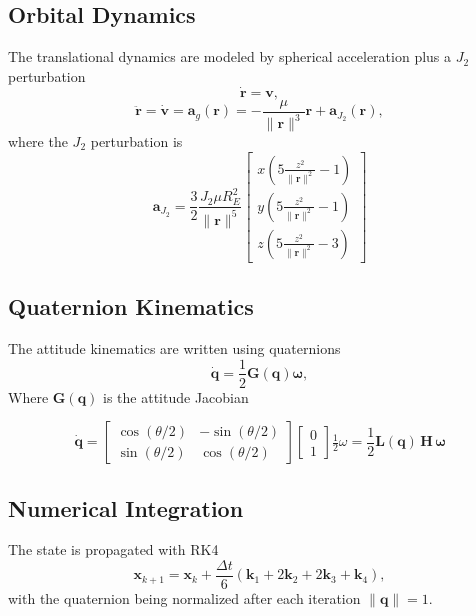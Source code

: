 \documentclass[conference,onecolumn,draftclsnofoot]{IEEEtran}
\begin{document}
\subsection{Orbital Dynamics}
The translational dynamics are modeled by spherical acceleration plus a $J_2$ perturbation \cite{markley2014fundamentals}
\begin{equation}
\dot{\mathbf{r}} = \mathbf{v},
\end{equation}
\begin{equation}
\ddot{\mathbf{r}} = \dot{\mathbf{v}} = \mathbf{a}_g(\mathbf{r}) = -\frac{\mu}{\|\mathbf{r}\|^3}\mathbf{r} + \mathbf{a}_{J_2}(\mathbf{r}),
\end{equation}
where the $J_2$ perturbation is
\begin{equation}
\mathbf{a}_{J_2} =
\frac{3}{2}\frac{J_2 \mu R_E^2}{\|\mathbf{r}\|^5}
\begin{bmatrix}
x\left(5\frac{z^2}{\|\mathbf{r}\|^2}-1\right) \\
y\left(5\frac{z^2}{\|\mathbf{r}\|^2}-1\right) \\
z\left(5\frac{z^2}{\|\mathbf{r}\|^2}-3\right)
\end{bmatrix}
\end{equation}

\subsection{Quaternion Kinematics}
The attitude kinematics are written using quaternions
\begin{equation}
\mathbf{\dot{q}} = \frac{1}{2}\mathbf{G(q)}\boldsymbol{\omega},
\end{equation}
Where $\mathbf{G(q)}$ is the attitude Jacobian

\begin{equation}
\mathbf{\dot{q}}
=
\begin{bmatrix}
\cos(\theta/2) & -\sin(\theta/2) \\
\sin(\theta/2) & \cos(\theta/2)
\end{bmatrix}
\begin{bmatrix}
0 \\
1
\end{bmatrix}
\tfrac{1}{2}\omega
=
\frac{1}{2} \mathbf{L(q)\,H\,\omega}
\end{equation}

\subsection{Numerical Integration}
The state is propagated with RK4
\begin{equation}
\mathbf{x}_{k+1} = \mathbf{x}_k + \frac{\Delta t}{6}
\left( \mathbf{k}_1 + 2\mathbf{k}_2 + 2\mathbf{k}_3 + \mathbf{k}_4 \right),
\end{equation}
with the quaternion being normalized after each iteration $\|\mathbf{q}\|=1$.
\end{document}
